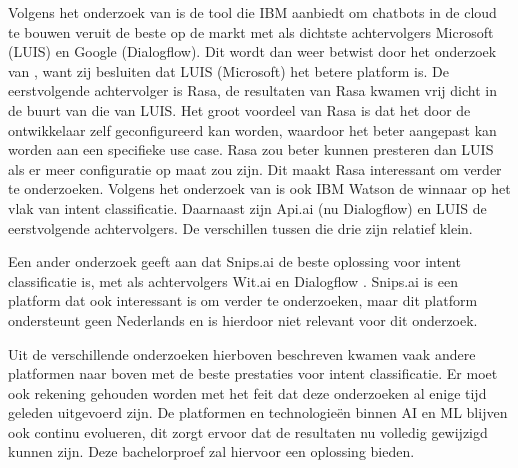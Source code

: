 Volgens het onderzoek van \textcite{Russis2018} is de tool die IBM aanbiedt om chatbots in de cloud te bouwen veruit de beste op de markt met als dichtste achtervolgers Microsoft (LUIS) en Google (Dialogflow). Dit wordt dan weer betwist door het onderzoek van \textcite{Langen2017}, want zij besluiten dat LUIS (Microsoft) het betere platform is. De eerstvolgende achtervolger is Rasa, de resultaten van Rasa kwamen vrij dicht in de buurt van die van LUIS. Het groot voordeel van Rasa is dat het door de ontwikkelaar zelf geconfigureerd kan worden, waardoor het beter aangepast kan worden aan een specifieke use case. Rasa zou beter kunnen presteren dan LUIS als er meer configuratie op maat zou zijn. Dit maakt Rasa interessant om verder te onderzoeken. Volgens het onderzoek van \textcite{Savenkov2017} is ook IBM Watson de winnaar op het vlak van intent classificatie. Daarnaast zijn Api.ai (nu Dialogflow) en LUIS de eerstvolgende achtervolgers. De verschillen tussen die drie zijn relatief klein.

Een ander onderzoek geeft aan dat Snips.ai de beste oplossing voor intent classificatie is,  met als achtervolgers Wit.ai en Dialogflow \autocite{Coucke2017}. Snips.ai is een platform dat ook interessant is om verder te onderzoeken, maar dit platform ondersteunt geen Nederlands en is hierdoor niet relevant voor dit onderzoek.

Uit de verschillende onderzoeken hierboven beschreven kwamen vaak andere platformen naar boven met de beste prestaties voor intent classificatie. Er moet ook rekening gehouden worden met het feit dat deze onderzoeken al enige tijd geleden uitgevoerd zijn. De platformen en technologieën binnen AI en ML blijven ook continu evolueren, dit zorgt ervoor dat de resultaten nu volledig gewijzigd kunnen zijn. Deze bachelorproef zal hiervoor een oplossing bieden.


